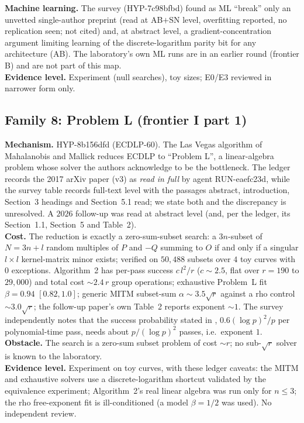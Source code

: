 \documentclass[11pt,a4paper]{article}
\theoremstyle{remark}
\begin{document}
\textbf{Machine learning.} The survey (\mbox{HYP-7c98bfbd}) found as ML ``break'' only an unvetted single-author preprint (read at AB$+$SN level, overfitting reported, no replication seen; not cited) and, at abstract level, a gradient-concentration argument limiting learning of the discrete-logarithm parity bit for any architecture \cite{Tak23} (AB). The laboratory's own ML runs are in an earlier round (frontier B) and are not part of this map.\\
\textbf{Evidence level.} Experiment (null searches), toy sizes; E0/E3 reviewed in narrower form only.

\subsection{Family 8: Problem L (frontier I part 1)}
\textbf{Mechanism.} \mbox{HYP-8b156dfd} (ECDLP-60). The Las Vegas algorithm of Mahalanobis and Mallick \cite{MM17} reduces ECDLP to ``Problem L'', a linear-algebra problem whose solver the authors acknowledge to be the bottleneck. The ledger records the 2017 arXiv paper (v3) as \emph{read in full} by agent RUN-eaefc23d, while the survey table records full-text level with the passages abstract, introduction, Section~3 headings and Section~5.1 read; we state both and the discrepancy is unresolved. A $2026$ follow-up \cite{Mah26} was read at abstract level (and, per the ledger, its Section~1.1, Section~5 and Table~2).\\
\textbf{Cost.} The reduction is exactly a zero-sum-subset search: a $3n$-subset of $N=3n+l$ random multiples of $P$ and $-Q$ summing to $O$ if and only if a singular $l\times l$ kernel-matrix minor exists; verified on $50{,}488$ subsets over $4$ toy curves with $0$ exceptions. Algorithm~2 has per-pass success $c\,l^2/r$ ($c\sim2.5$, flat over $r=190$ to $29{,}000$) and total cost $\sim2.4\,r$ group operations; exhaustive Problem~L fit $\beta=0.94$ $[0.82,1.0]$; generic MITM subset-sum $\alpha\sim3.5\sqrt r$ against a rho control $\sim3.0\sqrt r$; the follow-up paper's own Table~2 reports exponent $\sim1$. The survey independently notes that the success probability stated in \cite{MM17}, $0.6(\log p)^2/p$ per polynomial-time pass, needs about $p/(\log p)^2$ passes, i.e.\ exponent $1$.\\
\textbf{Obstacle.} The search is a zero-sum subset problem of cost $\sim r$; no sub-$\sqrt r$ solver is known to the laboratory.\\
\textbf{Evidence level.} Experiment on toy curves, with these ledger caveats: the MITM and exhaustive solvers use a discrete-logarithm shortcut validated by the equivalence experiment; Algorithm~2's real linear algebra was run only for $n\le3$; the rho free-exponent fit is ill-conditioned (a model $\beta=1/2$ was used). No independent review.
\end{document}

